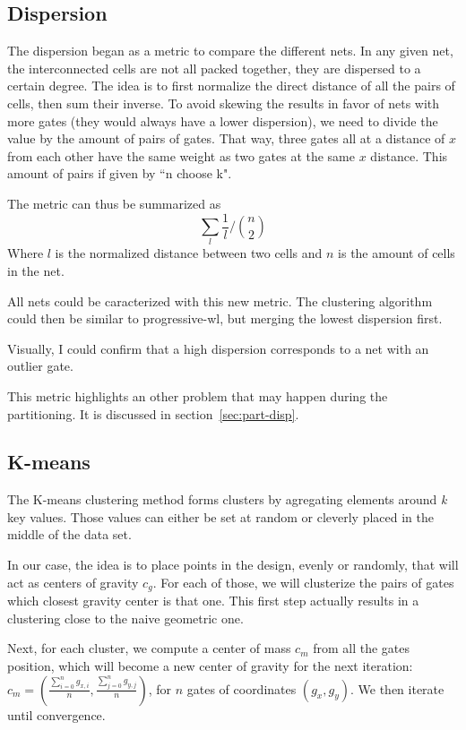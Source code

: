 \subsection{Dispersion}\label{sec:disp-clust}
The dispersion began as a metric to compare the different nets.
In any given net, the interconnected cells are not all packed together, they are dispersed to a certain degree.
The idea is to first normalize the direct distance of all the pairs of cells, then sum their inverse.
To avoid skewing the results in favor of nets with more gates (they would always have a lower dispersion), we need to divide the value by the amount of pairs of gates.
That way, three gates all at a distance of $x$ from each other have the same weight as two gates at the same $x$ distance.
This amount of pairs if given by ``n choose k".

The metric can thus be summarized as
\[ \sum_l \frac{1}{l}/ \binom{n}{2} \] %
Where $l$ is the normalized distance between two cells and $n$ is the amount of cells in the net.

All nets could be caracterized with this new metric.
The clustering algorithm could then be similar to progressive-wl, but merging the lowest dispersion first.

Visually, I could confirm that a high dispersion corresponds to a net with an outlier gate.

This metric highlights an other problem that may happen during the partitioning.
It is discussed in section~\ref{sec:part-disp}.

\subsection{K-means}
The K-means clustering method forms clusters by agregating elements around \textit{k} key values.
Those values can either be set at random or cleverly placed in the middle of the data set.

In our case, the idea is to place points in the design, evenly or randomly, that will act as centers of gravity $c_g$.
For each of those, we will clusterize the pairs of gates which closest gravity center is that one.
This first step actually results in a clustering close to the naive geometric one.

Next, for each cluster, we compute a center of mass $c_m$ from all the gates position, which will become a new center of gravity for the next iteration: $c_m = \left( \frac{\sum_{i = 0}^{n} g_{x,i}}{n}, \frac{\sum_{j = 0}^{n} g_{y,j}}{n} \right)$, for $n$ gates of coordinates $(g_x, g_y)$.
We then iterate until convergence.

